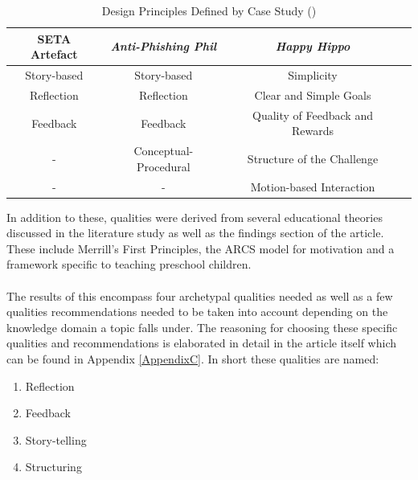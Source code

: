 \begin{table}[H]
\caption{Design Principles Defined by Case Study (\cite{Dincelli2020,Sheng2007,allers2021children})}
\begin{center}
\begin{tabular}{|c|c|c|c|}
\hline

\textbf{SETA Artefact} & \textbf{\textit{Anti-Phishing Phil}}& \textbf{\textit{Happy Hippo}} \\
\hline
Story-based	& Story-based 			& Simplicity  \\
Reflection	& Reflection			& Clear and Simple Goals  \\
Feedback	& Feedback 				& Quality of Feedback and Rewards  \\
	-		& Conceptual-Procedural	& Structure of the Challenge  \\
	-		& 		-				& Motion-based Interaction  \\
\hline

\end{tabular}
\label{tab4.1}
\end{center}
\end{table}

\noindent In addition to these, qualities were derived from several educational theories discussed in the literature study as well as the findings section of the article. These include Merrill's First Principles, the ARCS model for motivation and a framework specific to teaching preschool children.
\\\\
The results of this encompass four archetypal qualities needed as well as a few qualities recommendations needed to be taken into account depending on the knowledge domain a topic falls under. The reasoning for choosing these specific qualities and recommendations is elaborated in detail in the article itself which can be found in Appendix \ref{AppendixC}. In short these qualities are named:
\begin{enumerate}
\item Reflection
\item Feedback
\item Story-telling
\item Structuring
\end{enumerate}


